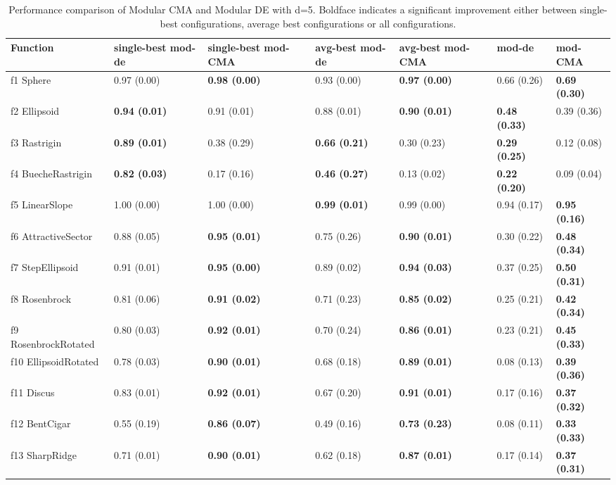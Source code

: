\begin{table}
\caption{Performance comparison of Modular CMA and Modular DE with d=5. Boldface indicates a significant improvement either between single-best configurations, average best configurations or all configurations.}
\begin{tabular}{lllllll}
\toprule
Function & single-best mod-de & single-best mod-CMA & avg-best mod-de & avg-best mod-CMA & mod-de & mod-CMA \\
\midrule
f1 Sphere & 0.97 (0.00) & \textbf{0.98 (0.00)} & 0.93 (0.00) & \textbf{0.97 (0.00)} & 0.66 (0.26) & \textbf{0.69 (0.30)} \\
f2 Ellipsoid & \textbf{0.94 (0.01)} & 0.91 (0.01) & 0.88 (0.01) & \textbf{0.90 (0.01)} & \textbf{0.48 (0.33)} & 0.39 (0.36) \\
f3 Rastrigin & \textbf{0.89 (0.01)} & 0.38 (0.29) & \textbf{0.66 (0.21)} & 0.30 (0.23) & \textbf{0.29 (0.25)} & 0.12 (0.08) \\
f4 BuecheRastrigin & \textbf{0.82 (0.03)} & 0.17 (0.16) & \textbf{0.46 (0.27)} & 0.13 (0.02) & \textbf{0.22 (0.20)} & 0.09 (0.04) \\
f5 LinearSlope & 1.00 (0.00) & 1.00 (0.00) & \textbf{0.99 (0.01)} & 0.99 (0.00) & 0.94 (0.17) & \textbf{0.95 (0.16)} \\
f6 AttractiveSector & 0.88 (0.05) & \textbf{0.95 (0.01)} & 0.75 (0.26) & \textbf{0.90 (0.01)} & 0.30 (0.22) & \textbf{0.48 (0.34)} \\
f7 StepEllipsoid & 0.91 (0.01) & \textbf{0.95 (0.00)} & 0.89 (0.02) & \textbf{0.94 (0.03)} & 0.37 (0.25) & \textbf{0.50 (0.31)} \\
f8 Rosenbrock & 0.81 (0.06) & \textbf{0.91 (0.02)} & 0.71 (0.23) & \textbf{0.85 (0.02)} & 0.25 (0.21) & \textbf{0.42 (0.34)} \\
f9 RosenbrockRotated & 0.80 (0.03) & \textbf{0.92 (0.01)} & 0.70 (0.24) & \textbf{0.86 (0.01)} & 0.23 (0.21) & \textbf{0.45 (0.33)} \\
f10 EllipsoidRotated & 0.78 (0.03) & \textbf{0.90 (0.01)} & 0.68 (0.18) & \textbf{0.89 (0.01)} & 0.08 (0.13) & \textbf{0.39 (0.36)} \\
f11 Discus & 0.83 (0.01) & \textbf{0.92 (0.01)} & 0.67 (0.20) & \textbf{0.91 (0.01)} & 0.17 (0.16) & \textbf{0.37 (0.32)} \\
f12 BentCigar & 0.55 (0.19) & \textbf{0.86 (0.07)} & 0.49 (0.16) & \textbf{0.73 (0.23)} & 0.08 (0.11) & \textbf{0.33 (0.33)} \\
f13 SharpRidge & 0.71 (0.01) & \textbf{0.90 (0.01)} & 0.62 (0.18) & \textbf{0.87 (0.01)} & 0.17 (0.14) & \textbf{0.37 (0.31)} \\

\end{tabular}
\end{table}
